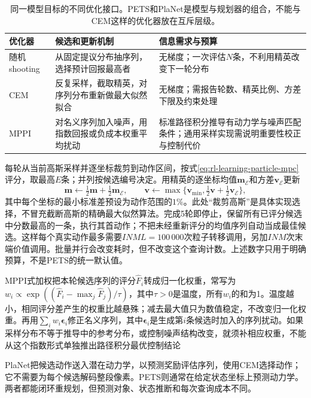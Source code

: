 \begin{table}[t]
  \centering
  \small
  \begin{tabularx}{\linewidth}{>{\raggedright\arraybackslash}p{18mm} >{\raggedright\arraybackslash}X >{\raggedright\arraybackslash}X}
    \toprule
    优化器 & 候选和更新机制 & 信息需求与预算 \\
    \midrule
    随机shooting & 从固定提议分布抽序列，选择预计回报最高者 & 无梯度；一次评估$N$条，不利用精英改变下一轮分布 \\
    CEM & 反复采样，截取精英，对序列分布重新做最大似然拟合 & 无梯度；需报告轮数、精英比例、方差下限及约束处理 \\
    MPPI & 对名义序列加入噪声，用指数回报或负成本权重平均扰动 & 标准路径积分推导有动力学与噪声匹配条件；通用采样实现需说明重要性校正与控制代价 \\
    \bottomrule
  \end{tabularx}
  \caption{同一模型目标的不同优化接口。PETS和PlaNet是模型与规划器的组合，不能与CEM这样的优化器放在互斥层级。}
  \label{tab:rl-learning-trajectory-optimizers}
\end{table}

每轮从当前高斯采样并逐坐标裁剪到动作区间，按式\eqref{eq:rl-learning-particle-mpc}评分，取最高$E$条；并列按候选编号决定。用精英的逐坐标均值$\bm m_{\mathcal E}$和方差$\bm v_{\mathcal E}$更新
\[
  \bm m\gets\tfrac12\bm m+\tfrac12\bm m_{\mathcal E},
  \qquad
  \bm v\gets\max\{\bm v_{\min},
                      \tfrac12\bm v+\tfrac12\bm v_{\mathcal E}\},
\]
其中每个坐标的最小标准差预设为动作范围的$1\%$。此处“裁剪高斯”是具体实现选择，不冒充截断高斯的精确最大似然算法。完成5轮即停止，保留所有已评分候选中分数最高的一条，执行其首动作；不把未经重新评分的均值序列自动当成最佳候选。这样每个真实动作最多需要$INML=100\,000$次粒子转移调用，另加$INM$次末端价值调用。批量并行会改变耗时，但不改变这个查询计数。上述数字只用于明确预算，不是PETS的统一默认值。

MPPI式加权把本轮候选序列的评分$\widehat F_i$转成归一化权重，常写为$w_i\propto\exp((\widehat F_i-\max_j\widehat F_j)/\tau)$，其中$\tau>0$是温度，所有$w_i$的和为1。温度越小，相同评分差产生的权重比越悬殊；减去最大值只为数值稳定，不改变归一化权重。再用$\sum_iw_i\bm\epsilon_i$修正名义序列，其中$\bm\epsilon_i$是生成第$i$条候选时加入的序列扰动。如果采样分布不等于推导中的参考分布，或控制噪声结构改变，就须补相应权重，不能从这个指数形式单独推出路径积分最优控制结论

PlaNet把候选动作送入潜在动力学，以预测奖励评估序列，使用CEM选择动作；它不需要为每个候选解码整段像素。PETS则通常在给定状态坐标上预测动力学。两者都能闭环重规划，但预测对象、状态推断和每次查询成本不同。


